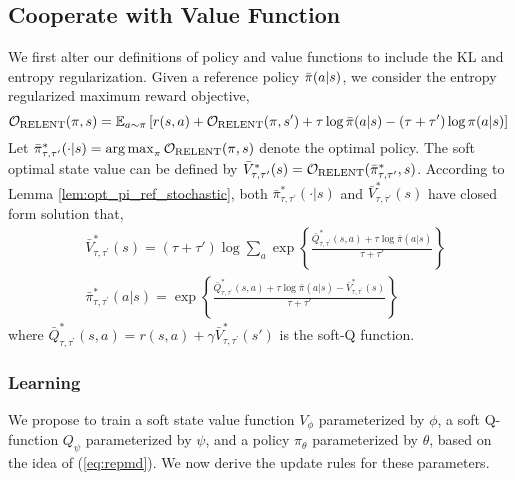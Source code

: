 \subsection{Cooperate with Value Function}

\newcommand{\parV}{V_{\phi}}
\newcommand{\parTargetV}{V_{\bar{\phi}}}
\newcommand{\parQ}{Q_{\psi}}
\newcommand{\parPi}{\pi_{\theta}}
\newcommand{\parQone}{Q_{\psi_1}}
\newcommand{\parQtwo}{Q_{\psi_2}}


We first alter our definitions of policy and value functions to include the KL and entropy regularization. Given a reference policy $\bar{\pi}(a|s)$, we consider the entropy regularized maximum reward objective, 
\begin{equation*}
{\mathcal{O}}_{\text{RELENT}}(\pi, s) = \mathbb{E}_{a\sim \pi} \left[ r(s,a) + {\mathcal{O}}_{\text{RELENT}}(\pi, s')  + \tau \log \bar{\pi}(a|s) - \left(\tau+ \tau' \right) \log \pi(a|s) \right] \\
\label{relent-obj}
\end{equation*}
Let $\bar{\pi}_{\tau,\tau^{\prime}}^* (\cdot|s) = \operatorname*{arg\,max}_{\pi} {\mathcal{O}}_{\text{RELENT}}(\pi, s) $ denote the optimal policy. The soft optimal state value can be defined by $\bar{V}_{\tau,\tau^{\prime}}^*(s) = {\mathcal{O}}_{\text{RELENT}}(\bar{\pi}_{\tau,\tau^{\prime}}^*, s)$. According to Lemma \ref{lem:opt_pi_ref_stochastic}, both $\bar{\pi}_{\tau,\tau^{\prime}}^*(\cdot | s)$ and $\bar{V}_{\tau,\tau^{\prime}}^*(s)$ have closed form solution that,
\begin{equation}
\begin{split}
& \bar{V}_{\tau,\tau^{\prime}}^*(s) = (\tau + \tau') \log \sum_a \exp \left\{ \frac{\bar{Q}_{\tau,\tau^{\prime}}^*(s,a) + \tau \log \bar{\pi}(a|s)} {\tau + \tau'} \right\} \\
& \bar{\pi}_{\tau,\tau^{\prime}}^* (a|s) = \exp \left\{ \frac{\bar{Q}_{\tau,\tau^{\prime}}^*(s,a) + \tau \log \bar{\pi}(a|s) - \bar{V}_{\tau,\tau^{\prime}}^*(s)}{\tau + \tau'} \right\}
\end{split}
\label{soft-v-and-pi}
\end{equation}
where $\bar{Q}_{\tau,\tau^{\prime}}^*(s,a) = r(s,a) + \gamma \bar{V}_{\tau,\tau^{\prime}}^*(s')$ is the soft-Q function.

\subsubsection{Learning}
We propose to train a soft state value function $\parV$ parameterized by $\phi$, a soft Q-function $\parQ$ parameterized by $\psi$, and a policy $\parPi$ parameterized by $\theta$, based on the idea of (\ref{eq:repmd}). We now derive the update rules for these parameters. 

